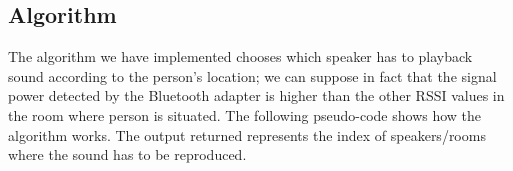 \documentclass[conference]{IEEEtran}
\begin{document}
%

\subsection{Algorithm}
The algorithm we have implemented chooses which speaker has to playback sound according to the person's location; we can suppose in fact that the signal power detected by the Bluetooth adapter is higher than the other RSSI values in the room where person is situated. The following pseudo-code shows how the algorithm works. The output returned represents the index of speakers/rooms where the sound has to be reproduced.
\end{document}
